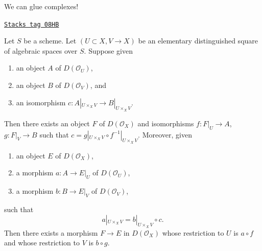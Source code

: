 We can glue complexes!

\begin{lemma}[Glue]
\label{spaces-perfect-lemma-glue}
\href{https://stacks.math.columbia.edu/tag/08HB}{\texttt{Stacks tag 08HB}}

Let $S$ be a scheme. Let $(U \subset X, V \to X)$ be an elementary
distinguished square of algebraic spaces over $S$. Suppose given
\begin{enumerate}
\item an object $A$ of $D(\mathcal{O}_U)$,
\item an object $B$ of $D(\mathcal{O}_V)$, and
\item an isomorphism $c : A|_{U \times_X V} \to B|_{U \times_X V}$.
\end{enumerate}
Then there exists an object $F$ of $D(\mathcal{O}_X)$
and isomorphisms $f : F|_U \to A$, $g : F|_V \to B$ such
that $c = g|_{U \times_X V} \circ f^{-1}|_{U \times_X V}$.
Moreover, given
\begin{enumerate}
\item an object $E$ of $D(\mathcal{O}_X)$,
\item a morphism $a : A \to E|_U$ of $D(\mathcal{O}_U)$,
\item a morphism $b : B \to E|_V$ of $D(\mathcal{O}_V)$,
\end{enumerate}
such that
$$
a|_{U \times_X V}  = b|_{U \times_X V} \circ c.
$$
Then there exists a morphism $F \to E$ in $D(\mathcal{O}_X)$
whose restriction to $U$ is $a \circ f$
and whose restriction to $V$ is $b \circ g$.
\end{lemma}

